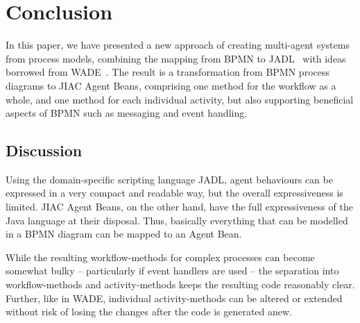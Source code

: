 

\section{Conclusion}
\label{sec:conclusion}

In this paper, we have presented a new approach of creating multi-agent systems from
process models, combining the mapping from BPMN to JADL~\cite{kuester2010integrating}
with ideas borrowed from WADE~\cite{caire2008wade}.  The result is a transformation
from BPMN process diagrams to JIAC Agent Beans, comprising one method for the
workflow as a whole, and one method for each individual activity, but also
supporting beneficial aspects of BPMN such as messaging and event handling.



\subsection{Discussion}

Using the domain-specific scripting language JADL, agent behaviours can be
expressed in a very compact and readable way, but the overall expressiveness is
limited.  JIAC Agent Beans, on the other hand, have the full expressiveness of
the Java language at their disposal.  Thus, basically everything that can be
modelled in a BPMN diagram can be mapped to an Agent Bean.

While the resulting workflow-methods for complex processes can become somewhat
bulky -- particularly if event handlers are used -- the separation into
workflow-methods and activity-methods keeps the resulting code reasonably clear.
Further, like in WADE, individual activity-methods can be altered or extended
without risk of losing the changes after the code is generated anew.

